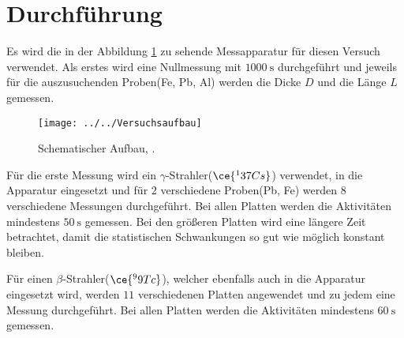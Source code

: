 \section{Durchführung}
\label{sec:Durchführung}
Es wird die in der Abbildung \ref{fig:versuchsaufbau} zu sehende Messapparatur für diesen Versuch verwendet. Als erstes wird eine Nullmessung mit $\SI{1000}{\second}$ durchgeführt und jeweils für die auszusuchenden Proben(Fe, Pb, Al) werden die Dicke $D$ und die Länge $L$ gemessen. 

\begin{figure}[h!]
	\centering
	\texttt{[image: ../../Versuchsaufbau]}
	\caption{Schematischer Aufbau, \cite[14]{anleitung704}.}
	\label{fig:versuchsaufbau}
\end{figure}

Für die erste Messung wird ein $\gamma$-Strahler($\ce{^137 Cs}$) verwendet, in die Apparatur eingesetzt und für $2$ verschiedene Proben(Pb, Fe) werden $8$ verschiedene Messungen durchgeführt. Bei allen Platten werden die Aktivitäten mindestens $\SI{50}{\second}$ gemessen. Bei den größeren Platten wird eine längere Zeit betrachtet, damit die statistischen Schwankungen so gut wie möglich konstant bleiben. 

Für einen $\beta$-Strahler($\ce{^99 Tc}$), welcher ebenfalls auch in die Apparatur eingesetzt wird, werden $11$ verschiedenen Platten angewendet und zu jedem eine Messung durchgeführt. Bei allen Platten werden die Aktivitäten mindestens $\SI{60}{\second}$ gemessen. 